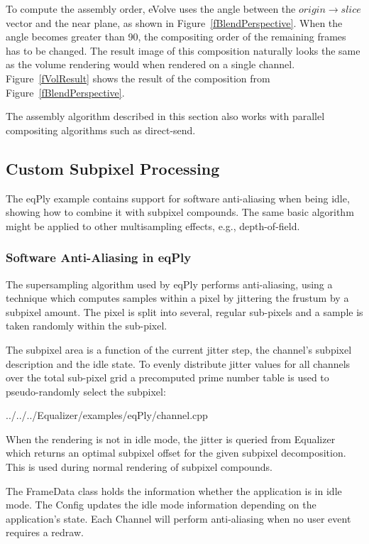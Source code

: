 \documentclass[10pt,a4]{scrartcl}
\newcommand{\fig}[1]{Figure~\ref{#1}}
\begin{document}
To compute the assembly order, \textsf{eVolve} uses the angle between
the $origin \rightarrow slice$ vector and the near plane, as shown in
\fig{fBlendPerspective}. When the angle becomes greater than
90\textdegree, the compositing order of the remaining frames has to be
changed. The result image of this composition naturally looks the same
as the volume rendering would when rendered on a single
channel. \fig{fVolResult} shows the result of the composition from
\fig{fBlendPerspective}.

The assembly algorithm described in this section also works with parallel
compositing algorithms such as direct-send. 

\subsection{\label{sFSAA}Custom Subpixel Processing}

The eqPly example contains support for software anti-aliasing when being idle,
showing how to combine it with subpixel compounds. The same basic algorithm
might be applied to other multisampling effects, e.g., depth-of-field.

\subsubsection{Software Anti-Aliasing in eqPly}

The supersampling algorithm used by eqPly performs anti-aliasing, using a
technique which computes samples within a pixel by jittering the frustum by a
subpixel amount. The pixel is split into several, regular sub-pixels and a
sample is taken randomly within the sub-pixel.

The subpixel area is a function of the current jitter step, the channel's
\textsf{subpixel} description and the idle state. To evenly distribute jitter
values for all channels over the total sub-pixel grid a precomputed prime number
table is used to pseudo-randomly select the subpixel:

{\footnotesize
  {../../../Equalizer/examples/eqPly/channel.cpp}}

When the rendering is not in idle mode, the jitter is queried from
Equalizer which returns an optimal subpixel offset for the given subpixel
decomposition. This is used during normal rendering of subpixel compounds.

The \textsf{FrameData} class holds the information whether the application is in
idle mode. The \textsf{Config} updates the idle mode information depending on
the application's state.  Each \textsf{Channel} will perform anti-aliasing when
no user event requires a redraw.
\end{document}

